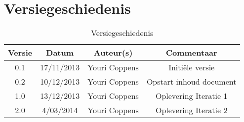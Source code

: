 \chapter{Versiegeschiedenis}

\begin{table}[htbp]
	\centering
	\begin{tabular} {|c|c|c|c|}
	    \hline
		\textbf{Versie} & \textbf{Datum} 	& \textbf{Auteur(s)} & \textbf{Commentaar} \\
		\hline
		0.1	& 17/11/2013	& Youri Coppens	& Initi\"{e}le versie\\
		\hline
		0.2	& 10/12/2013	& Youri Coppens	& Opstart inhoud document\\
		\hline
		1.0	& 13/12/2013	& Youri Coppens	& Oplevering Iteratie 1\\ 
		\hline
		2.0	& 4/03/2014	& Youri Coppens	& Oplevering Iteratie 2\\
		\hline
	\end{tabular}
	\caption{Versiegeschiedenis}
\end{table}